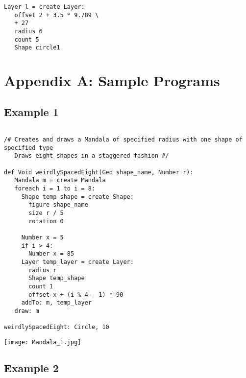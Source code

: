 \documentclass[12pt]{report}
\begin{document}
\begin{verbatim}
Layer l = create Layer:
   offset 2 + 3.5 * 9.789 \
   + 27
   radius 6
   count 5
   Shape circle1
\end{verbatim}

\newpage
{}
\section*{Appendix A: Sample Programs}

	\subsection*{Example 1}
    
\begin{verbatim}
        
/# Creates and draws a Mandala of specified radius with one shape of specified type
   Draws eight shapes in a staggered fashion #/
   
def Void weirdlySpacedEight(Geo shape_name, Number r):
   Mandala m = create Mandala
   foreach i = 1 to i = 8:
     Shape temp_shape = create Shape:
       figure shape_name
       size r / 5
       rotation 0 
    
     Number x = 5
     if i > 4:
       Number x = 85
     Layer temp_layer = create Layer:
       radius r
       Shape temp_shape
       count 1
       offset x + (i % 4 - 1) * 90
     addTo: m, temp_layer
   draw: m
   
weirdlySpacedEight: Circle, 10

\end{verbatim}
\begin{center}
\texttt{[image: Mandala\_1.jpg]}
\end{center}    
\newpage
\subsection*{Example 2}
\end{document}
